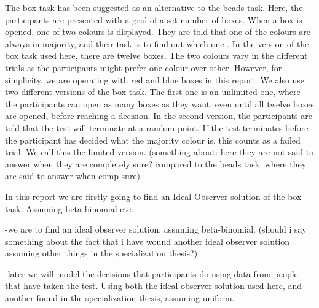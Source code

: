 The box task has been suggested as an alternative to the beads task. Here, the participants are presented with a grid of a set number of boxes. When a box is opened, one of two colours is displayed. They are told that one of the colours are always in majority, and their task is to find out which one \citep{moritz2017}. In the version of the box task used here, there are twelve boxes. The two colours vary in the different trials as the participants might prefer one colour over other. However, for simplicity, we are operating with red and blue boxes in this report. We also use two different versions of the box task. The first one is an unlimited one, where the participants can open as many boxes as they want, even until all twelve boxes are opened, before reaching a decision. In the second version, the participants are told that the test will terminate at a random point. If the test terminates before the participant has decided what the majority colour is, this counts as a failed trial. We call this the limited version. (something about: here they are not said to answer when they are completely sure? compared to the beads task, where they are said to answer when comp sure)

In this report we are firstly going to find an Ideal Observer solution of the box task. 
Assuming beta binomial etc. 


-we are to find an ideal observer solution. assuming beta-binomial.
(should i say something about the fact that i have wound another ideal observer solution assuming other things in the specialization thesis?)




-later we will model the decisions that participants do using data from people that have taken the test. Using both the ideal observer solution used here, and another found in the specialization thesis, assuming uniform. 
